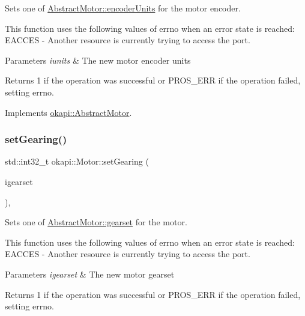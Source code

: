 Sets one of \mbox{\hyperlink{classokapi_1_1AbstractMotor_ae811cd825099f2defadeb1b7f7e7764c}{Abstract\+Motor\+::encoder\+Units}} for the motor encoder.

This function uses the following values of errno when an error state is reached\+: E\+A\+C\+C\+ES -\/ Another resource is currently trying to access the port.


\begin{DoxyParams}{Parameters}
{\em iunits} & The new motor encoder units \\
\hline
\end{DoxyParams}
\begin{DoxyReturn}{Returns}
1 if the operation was successful or P\+R\+O\+S\+\_\+\+E\+RR if the operation failed, setting errno. 
\end{DoxyReturn}


Implements \mbox{\hyperlink{classokapi_1_1AbstractMotor_aae559b72399b0eb2124d969e40f97415}{okapi\+::\+Abstract\+Motor}}.

\mbox{\label{classokapi_1_1Motor_a670cb230fe9686ce8fa71ee20607eb12}} 
\subsubsection{\texorpdfstring{setGearing()}{setGearing()}}
{\footnotesize\ttfamily std\+::int32\+\_\+t okapi\+::\+Motor\+::set\+Gearing (\begin{DoxyParamCaption}\item[{\mbox{\hyperlink{classokapi_1_1AbstractMotor_a88aaa6ea2fa10f5520a537bbf26774d5}{Abstract\+Motor\+::gearset}}}]{igearset }\end{DoxyParamCaption})\hspace{0.3cm}{\ttfamily [override]}, {\ttfamily [virtual]}}

Sets one of \mbox{\hyperlink{classokapi_1_1AbstractMotor_a88aaa6ea2fa10f5520a537bbf26774d5}{Abstract\+Motor\+::gearset}} for the motor.

This function uses the following values of errno when an error state is reached\+: E\+A\+C\+C\+ES -\/ Another resource is currently trying to access the port.


\begin{DoxyParams}{Parameters}
{\em igearset} & The new motor gearset \\
\hline
\end{DoxyParams}
\begin{DoxyReturn}{Returns}
1 if the operation was successful or P\+R\+O\+S\+\_\+\+E\+RR if the operation failed, setting errno. 
\end{DoxyReturn}


